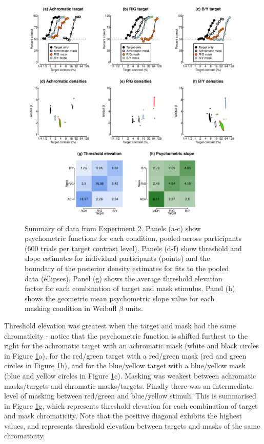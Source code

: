 \documentclass[
]{article}
\begin{document}
\begin{figure}

{\centering \includegraphics{Figures/MCSdata} 

}

\caption{Summary of data from Experiment 2. Panels (a-c) show psychometric functions for each condition, pooled across participants (600 trials per target contrast level). Panels (d-f) show threshold and slope estimates for individual participants (points) and the boundary of the posterior density estimates for fits to the pooled data (ellipses). Panel (g) shows the average threshold elevation factor for each combination of target and mask stimulus. Panel (h) shows the geometric mean psychometric slope value for each masking condition in Weibull $\beta$ units.}\label{fig:MCSfig}
\end{figure}

Threshold elevation was greatest when the target and mask had the same chromaticity - notice that the psychometric function is shifted furthest to the right for the achromatic target with an achromatic mask (white and black circles in Figure \ref{fig:MCSfig}a), for the red/green target with a red/green mask (red and green circles in Figure \ref{fig:MCSfig}b), and for the blue/yellow target with a blue/yellow mask (blue and yellow circles in Figure \ref{fig:MCSfig}c). Masking was weakest between achromatic masks/targets and chromatic masks/targets. Finally there was an intermediate level of masking between red/green and blue/yellow stimuli. This is summarised in Figure \ref{fig:MCSfig}g, which represents threshold elevation for each combination of target and mask chromaticity. Note that the positive diagonal exhibits the highest values, and represents threshold elevation between targets and masks of the same chromaticity.
\end{document}

